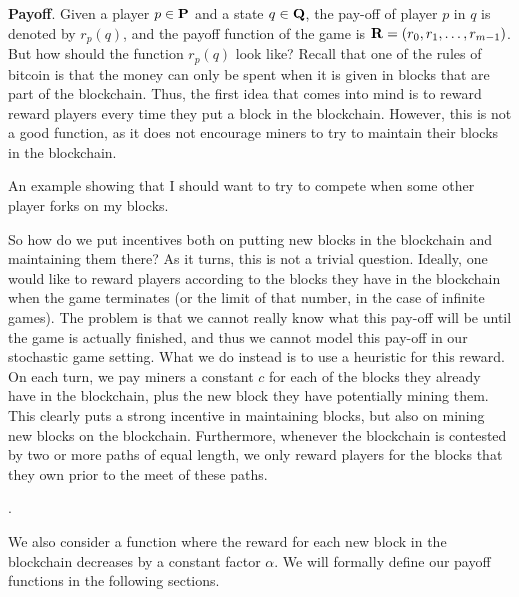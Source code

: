 \medskip
\noindent
\textbf{Payoff}.
Given a player $p \in \mathbf{P}$ and a state $q \in \mathbf{Q}$, the pay-off of player $p$ in $q$ is denoted by $r_p(q)$, and the payoff function of the game is $\mathbf{R} = (r_0, r_1, \ldots, r_{m-1})$. %
But how should the function $r_p(q)$ look like? Recall that one of the rules of bitcoin is that the money can only 
be spent when it is given in blocks that are part of the blockchain. Thus, the first idea that comes into mind is to reward 
reward players every time they put a block in the blockchain. However, this is not a good function, as it does not encourage miners to try to maintain their blocks in the blockchain. 

\begin{myex} 
An example showing that I should want to try to compete when some other player forks on my blocks. 
\end{myex} 

So how do we put incentives both on putting new blocks in the blockchain and maintaining them there? As it turns, this is not a trivial question. Ideally, one would like to reward players according to the blocks they have in the blockchain when the game terminates (or the limit of that number, in the case of infinite games). The problem is that we cannot really know what this pay-off will be until the game is actually finished, and thus we cannot model this pay-off in our stochastic game setting. 
What we do instead is to use a heuristic for this reward. On each turn, we pay miners a constant $c$ for each of the blocks they already have in the blockchain, plus the new block they have potentially mining them. This clearly puts a strong incentive in maintaining blocks, but also on mining new blocks on the blockchain. Furthermore, whenever the blockchain is contested by two or more paths of equal length, we only reward players for the blocks that they own prior to the meet of these paths. 

.

We also consider a function where the reward for each new block in the blockchain decreases by a constant factor $\alpha$. We will formally define our payoff functions in the following sections. 


